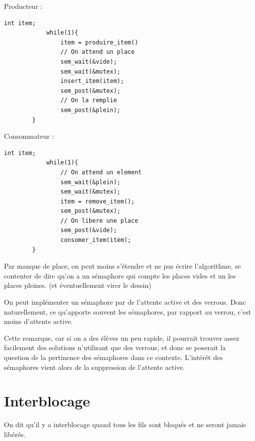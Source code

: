 \begin{appl}
	\begin{minipage}{0.45\textwidth}
		Producteur :
		\begin{lstlisting}[style=Cstyle]
			int item;
			while(1){
				item = produire_item()
				// On attend un place
				sem_wait(&vide);
				sem_wait(&mutex);
				insert_item(item);
				sem_post(&mutex);
				// On la remplie
				sem_post(&plein);
		}\end{lstlisting}
	\end{minipage}\qquad
	\begin{minipage}{0.45\textwidth}
		Consommateur :
		\begin{lstlisting}[style=Cstyle]
			int item;
			while(1){
				// On attend un element
				sem_wait(&plein);
				sem_wait(&mutex);
				item = remove_item();
				sem_post(&mutex);
				// On libere une place
				sem_post(&vide);
				consomer_item(item);
		}\end{lstlisting}
	\end{minipage}
	
\end{appl}

\begin{com}
	Par manque de place, on peut moins s'étendre et ne pas écrire l'algorithme, se contenter de dire qu'on a un sémaphore qui compte les places vides et un les places pleines. (et éventuellement virer le dessin)
\end{com}

\begin{rem}
	On peut implémenter un sémaphore par de l'attente active et des verrous. Donc naturellement, ce qu'apporte souvent les sémaphores, par rapport au verrou, c'est moins d'attente active.
\end{rem}

\begin{com}
	Cette remarque, car si on a des élèves un peu rapide, il pourrait trouver assez facilement des solutions n'utilisant que des verrous, et donc se poserait la question de la pertinence des sémaphores dans ce contexte. L'intérêt des sémaphores vient alors de la suppression de l'attente active.
\end{com}

\section{Interblocage}

\begin{definition}
	On dit qu'il y a interblocage quand tous les fils sont bloqués et ne seront jamais libérés.
\end{definition}

